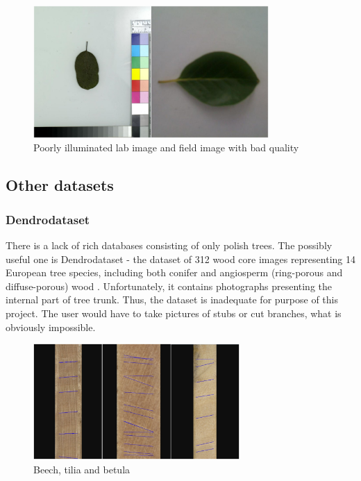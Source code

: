 \documentclass[../Main.tex]{subfiles}
\begin{document}
    \begin{figure}[ht]
        \centering
        \includegraphics[width=0.8\textwidth]{Images/datasets/04_leafsnap2_combined.jpg}
        \caption{Poorly illuminated lab image and field image with bad quality \cite{leafsnap-db}}
            \label{fig:04_leafsnap2_combined}
    \end{figure}
    
\subsection{Other datasets}
    \subsubsection{Dendrodataset}
    There is a lack of rich databases consisting of only polish trees. The possibly useful one is Dendrodataset -  the dataset of 312 wood core images representing 14 European tree species, including both conifer and angiosperm (ring-porous and diffuse-porous) wood \cite{Fabijanska2021}.
    Unfortunately, it contains photographs presenting the internal part of tree trunk. Thus, the dataset is inadequate for purpose of this project. The user would have to take pictures of stubs or cut branches, what is obviously impossible.

    \begin{figure}[ht]
        \centering
        \includegraphics[width=0.7\textwidth]{Images/datasets/04_dendro_combined.jpg}
        \caption{Beech, tilia and betula\cite{Fabijanska2021}}
            \label{fig:04_dendro_combined}
    \end{figure}
    
\end{document}
